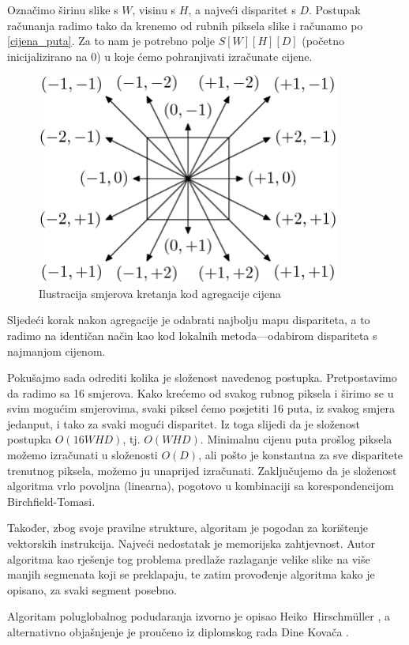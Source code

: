 \documentclass[utf8, zavrsni, numeric]{fer}
\begin{document}
Označimo širinu slike s $W$, visinu s $H$, a najveći disparitet s $D$.
Postupak računanja radimo tako da krenemo od rubnih piksela slike i računamo po \ref{cijena_puta}. Za to nam je potrebno polje $S[W][H][D]$ (početno inicijalizirano na 0) u koje ćemo pohranjivati izračunate cijene.


\begin{figure}[H]
  \centering
  \includegraphics[width=10cm]{img/sgm_smjerovi.png}
  \caption{Ilustracija smjerova kretanja kod agregacije cijena}
  \label{fig:SGM-paths}
\end{figure}

Sljedeći korak nakon agregacije je odabrati najbolju mapu dispariteta, a to radimo na identičan način
kao kod lokalnih metoda---odabirom dispariteta s najmanjom cijenom.

Pokušajmo sada odrediti kolika je složenost navedenog postupka. Pretpostavimo da radimo sa 16 smjerova. Kako krećemo od svakog rubnog piksela i širimo se u svim mogućim smjerovima, svaki
piksel ćemo posjetiti 16 puta, iz svakog smjera jedanput, i tako za svaki mogući disparitet. Iz toga slijedi da je složenost postupka $O(16WHD)$, tj. $O(WHD)$.
Minimalnu cijenu puta prošlog piksela možemo izračunati u složenosti $O(D)$, ali pošto je konstantna za sve disparitete trenutnog piksela, možemo ju unaprijed izračunati. Zaključujemo da je složenost algoritma vrlo povoljna (linearna), pogotovo u kombinaciji sa korespondencijom Birchfield-Tomasi.

Također, zbog svoje pravilne strukture, algoritam je pogodan za korištenje vektorskih instrukcija. Najveći nedostatak je memorijska zahtjevnost. Autor algoritma kao rješenje tog problema predlaže
razlaganje velike slike na više manjih segmenata koji se preklapaju, te zatim provođenje algoritma kako je opisano, za svaki segment posebno.

Algoritam poluglobalnog podudaranja izvorno je opisao Heiko~Hirschm{\"u}ller \cite{hirschmuller2008stereo}, a alternativno objašnjenje je proučeno iz diplomskog rada Dine Kovača \cite{kovac15ms}.
\end{document}
